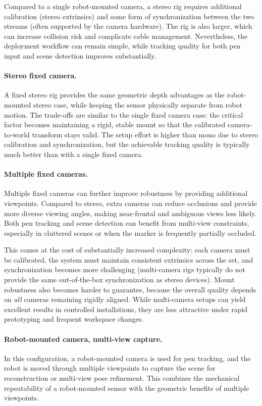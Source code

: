 Compared to a single robot-mounted camera, a stereo rig requires additional calibration (stereo extrinsics) and some form of synchronization between the two streams (often supported by the camera hardware). The rig is also larger, which can increase collision risk and complicate cable management. Nevertheless, the deployment workflow can remain simple, while tracking quality for both pen input and scene detection improves substantially.

\paragraph{Stereo fixed camera.}
A fixed stereo rig provides the same geometric depth advantages as the robot-mounted stereo case, while keeping the sensor physically separate from robot motion. The trade-offs are similar to the single fixed camera case: the critical factor becomes maintaining a rigid, stable mount so that the calibrated camera-to-world transform stays valid. The setup effort is higher than mono due to stereo calibration and synchronization, but the achievable tracking quality is typically much better than with a single fixed camera.

\paragraph{Multiple fixed cameras.}
Multiple fixed cameras can further improve robustness by providing additional viewpoints. Compared to stereo, extra cameras can reduce occlusions and provide more diverse viewing angles, making near-frontal and ambiguous views less likely. Both pen tracking and scene detection can benefit from multi-view constraints, especially in cluttered scenes or when the marker is frequently partially occluded.

This comes at the cost of substantially increased complexity: each camera must be calibrated, the system must maintain consistent extrinsics across the set, and synchronization becomes more challenging (multi-camera rigs typically do not provide the same out-of-the-box synchronization as stereo devices). Mount robustness also becomes harder to guarantee, because the overall quality depends on \emph{all} cameras remaining rigidly aligned. While multi-camera setups can yield excellent results in controlled installations, they are less attractive under rapid prototyping and frequent workspace changes.

\paragraph{Robot-mounted camera, multi-view capture.}
In this configuration, a robot-mounted camera is used for pen tracking, and the robot is moved through multiple viewpoints to capture the scene for reconstruction or multi-view pose refinement. This combines the mechanical repeatability of a robot-mounted sensor with the geometric benefits of multiple viewpoints.

